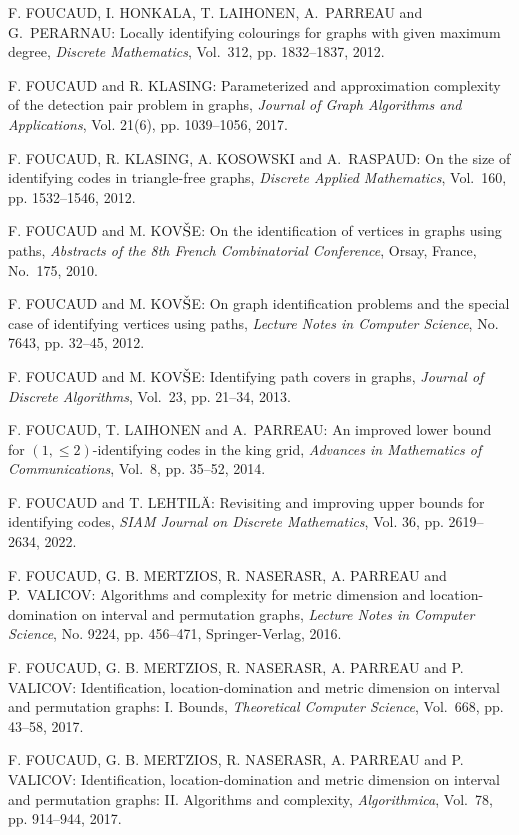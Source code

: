 \begin{thebibliography}{999}
F. FOUCAUD, I. HONKALA, T. LAIHONEN, A.~PARREAU and G.~PERARNAU: Locally identifying colourings for graphs with given maximum degree, {\it Discrete Mathematics}, Vol.~312, pp. 1832--1837, 2012.

F. FOUCAUD and R. KLASING: Parameterized and approximation complexity of the detection pair problem in graphs, {\it Journal of Graph Algorithms and Applications}, Vol. 21(6), pp. 1039--1056, 2017.

F. FOUCAUD, R. KLASING, A. KOSOWSKI and A.~RASPAUD: On the size of identifying codes in triangle-free graphs, {\it Discrete Applied Mathematics}, Vol.~160, pp. 1532--1546, 2012.

F. FOUCAUD and M. KOV$\check{\rm S}$E: On the identification of vertices in graphs using paths, {\it Abstracts of the 8th French Combinatorial Conference}, Orsay, France, No.~175, 2010.

F. FOUCAUD and M. KOV$\check{\rm S}$E: On graph identification problems and the special case of identifying vertices using paths, {\it Lecture Notes in Computer Science}, No. 7643, pp. 32--45, 2012.

F. FOUCAUD and M. KOV$\check{\rm S}$E: Identifying path covers in graphs, {\it Journal of Discrete Algorithms}, Vol.~23, pp. 21--34, 2013.

F. FOUCAUD, T. LAIHONEN and A.~PARREAU: An improved lower bound for $(1, \leq 2)$-identifying codes in the king grid, {\it Advances in Mathematics of Communications}, Vol.~8, pp. 35--52, 2014.

F. FOUCAUD and T. LEHTIL\"A: Revisiting and improving upper bounds for identifying codes, {\it SIAM Journal on Discrete Mathematics}, Vol. 36, pp. 2619--2634, 2022.

F. FOUCAUD, G. B. MERTZIOS, R. NASERASR, A. PARREAU and P.~VALICOV: Algorithms and complexity for metric dimension and location-domination on interval and permutation graphs, {\it Lecture Notes in Computer Science}, No. 9224, pp. 456--471, Springer-Verlag, 2016.

F. FOUCAUD, G. B. MERTZIOS, R. NASERASR, A. PARREAU and P. VALICOV: Identification, location-domination and metric dimension on interval and permutation graphs: I. Bounds, {\it Theoretical Computer Science}, Vol.~668, pp. 43--58, 2017.

F. FOUCAUD, G. B. MERTZIOS, R. NASERASR, A. PARREAU and P. VALICOV: Identification, location-domination and metric dimension on interval and permutation graphs: II. Algorithms and complexity, {\it Algorithmica}, Vol.~78, pp. 914--944, 2017.


\end{thebibliography}
